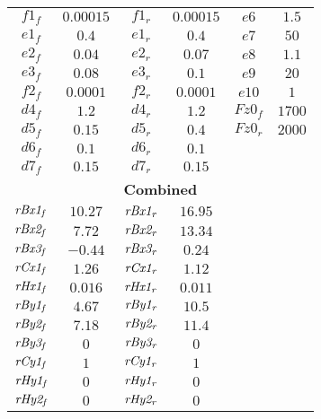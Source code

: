 \begin{longtable}{cccccc}
$f1_f$ & $0.00015$   &  $f1_r$ & $0.00015$ &  $e6   $ & $1.5 $ \\    
$e1_f$ & $0.4    $   &  $e1_r$ & $0.4    $ &  $e7   $ & $50  $ \\    
$e2_f$ & $0.04   $   &  $e2_r$ & $0.07   $ &  $e8   $ & $1.1 $ \\    
$e3_f$ & $0.08   $   &  $e3_r$ & $0.1    $ &  $e9   $ & $20  $ \\    
$f2_f$ & $0.0001 $   &  $f2_r$ & $0.0001 $ &  $e10  $ & $1   $ \\    
$d4_f$ & $1.2    $   &  $d4_r$ & $1.2    $ &  $Fz0_f$ & $1700$ \\    
$d5_f$ & $0.15   $   &  $d5_r$ & $0.4    $ &  $Fz0_r$ & $2000$ \\    
$d6_f$ & $0.1    $   &  $d6_r$ & $0.1    $ &          &        \\ 
$d7_f$ & $0.15   $   &  $d7_r$ & $0.15   $ &          &        \\ \hline
\multicolumn{6}{c}{\textbf{Combined}}\\ \hline
${\it rBx1_f}$ & $10.27$ & ${\it rBx1_r}$ & $16.95$ & & \\
${\it rBx2_f}$ & $7.72 $ & ${\it rBx2_r}$ & $13.34$ & & \\
${\it rBx3_f}$ & $-0.44$ & ${\it rBx3_r}$ & $0.24 $ & & \\
${\it rCx1_f}$ & $1.26 $ & ${\it rCx1_r}$ & $1.12 $ & & \\
${\it rHx1_f}$ & $0.016$ & ${\it rHx1_r}$ & $0.011$ & & \\
${\it rBy1_f}$ & $4.67 $ & ${\it rBy1_r}$ & $10.5 $ & & \\
${\it rBy2_f}$ & $7.18 $ & ${\it rBy2_r}$ & $11.4 $ & & \\
${\it rBy3_f}$ & $0    $ & ${\it rBy3_r}$ & $0    $ & & \\
${\it rCy1_f}$ & $1    $ & ${\it rCy1_r}$ & $1    $ & & \\
${\it rHy1_f}$ & $0    $ & ${\it rHy1_r}$ & $0    $ & & \\
${\it rHy2_f}$ & $0    $ & ${\it rHy2_r}$ & $0    $ & & \\
\end{longtable}
%

%
